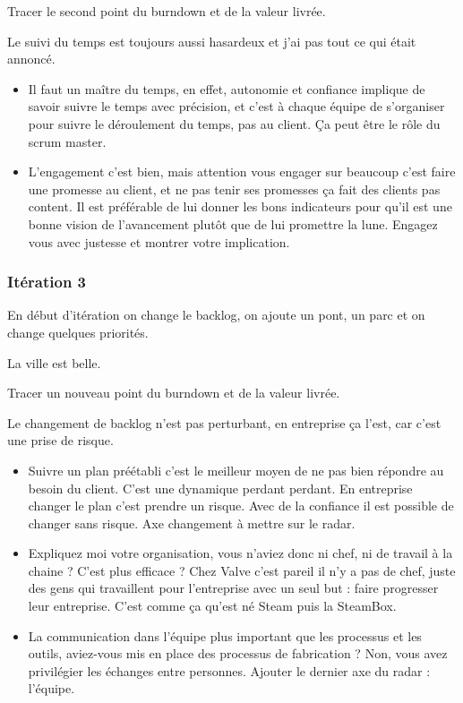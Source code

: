 \documentclass[a4paper,12pt]{article}
\begin{document}
Tracer le second point du burndown et de la valeur livrée. 

Le suivi du temps est toujours aussi hasardeux et j'ai pas tout ce qui était annoncé.

\begin{itemize}
  \item Il faut un maître du temps, en effet, autonomie et confiance implique de savoir suivre le temps avec précision, et c'est à chaque équipe de s'organiser pour suivre le déroulement du temps, pas au client. Ça peut être le rôle du scrum master.
  \item L'engagement c'est bien, mais attention vous engager sur beaucoup c'est faire une promesse au client, et ne pas tenir ses promesses ça fait des clients pas content. Il est préférable de lui donner les bons indicateurs pour qu'il est une bonne vision de l'avancement plutôt que de lui promettre la lune. Engagez vous avec justesse et montrer votre implication.
\end{itemize}

\subsubsection{Itération 3}
En début d'itération on change le backlog, on ajoute un pont, un parc et on change quelques priorités.

La ville est belle.

Tracer un nouveau point du burndown et de la valeur livrée. 

Le changement de backlog n'est pas perturbant, en entreprise ça l'est, car c'est une prise de risque.

\begin{itemize}
  \item Suivre un plan préétabli c'est le meilleur moyen de ne pas bien répondre au besoin du client. C'est une dynamique perdant perdant. En entreprise changer le plan c'est prendre un risque. Avec de la confiance il est possible de changer sans risque. Axe changement à mettre sur le radar.
  \item Expliquez moi votre organisation, vous n'aviez donc ni chef, ni de travail à la chaine ? C'est plus efficace ? Chez Valve c'est pareil il n'y a pas de chef, juste des gens qui travaillent pour l'entreprise avec un seul but : faire progresser leur entreprise. C'est comme ça qu'est né Steam puis la SteamBox.
  \item La communication dans l'équipe plus important que les processus et les outils, aviez-vous mis en place des processus de fabrication ? Non, vous avez privilégier les échanges entre personnes. Ajouter le dernier axe du radar : l'équipe.
\end{itemize}
\end{document}
